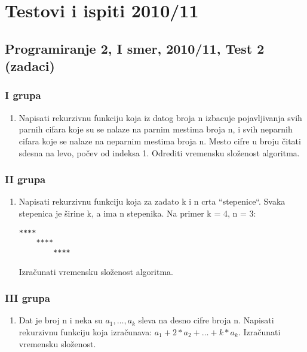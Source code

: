 \chapter{Testovi i ispiti 2010/11}

\section{Programiranje 2, I smer, 2010/11, Test 2 (zadaci)}
\subsection{I grupa}
\begin{enumerate}
 \item Napisati rekurzivnu funkciju koja iz datog broja n izbacuje pojavljivanja svih parnih cifara
       koje su se nalaze na parnim mestima broja n, i svih neparnih cifara koje se nalaze na neparnim
       mestima broja n. Mesto cifre u broju \v citati sdesna na levo, po\v cev od indeksa 1. Odrediti
       vremensku slo\v zenost algoritma.
\end{enumerate}

\subsection{II grupa}
\begin{enumerate}
 \item Napisati rekurzivnu funkciju koja za zadato k i n crta ``stepenice``. Svaka stepenica je \v sirine k,
      a ima n stepenika. Na primer k = 4, n = 3:
\begin{verbatim}
****
    ****
        ****
\end{verbatim}
Izra\v cunati vremensku slo\v zenost algoritma.
\end{enumerate}

\subsection{III grupa}
\begin{enumerate}
 \item  Dat je broj n i neka su $a_1, \ldots, a_k$ sleva na desno cifre broja n. Napisati rekurzivnu funkciju koja izra\v cunava:
      $a_1 + 2*a_2 + \ldots + k*a_k$.  Izra\v cunati vremensku slo\v zenost.
\end{enumerate}


